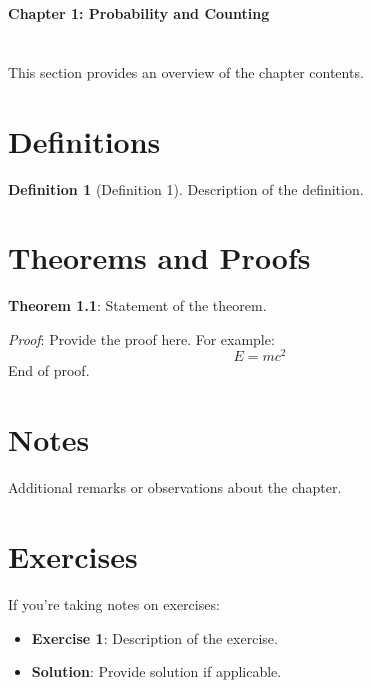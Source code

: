 \documentclass[12pt]{article}   %
\theoremstyle{definition}
\newtheorem{definition}{Definition}[section]
\theoremstyle{remark}
\begin{document}
\begin{center}
    \Large{\textbf{Chapter 1: Probability and Counting}} \\
\end{center}

\section{}
This section provides an overview of the chapter contents.

\section{Definitions}
\begin{definition}[Definition 1]
	Description of the definition.
\end{definition}

\section{Theorems and Proofs}
\textbf{Theorem 1.1}: Statement of the theorem.

\textit{Proof}: Provide the proof here. For example:
\[
E = mc^2
\]
End of proof.

\section{Notes}
Additional remarks or observations about the chapter.

\section{Exercises}
If you're taking notes on exercises:
\begin{itemize}
    \item \textbf{Exercise 1}: Description of the exercise.
    \item \textbf{Solution}: Provide solution if applicable.
\end{itemize}

\end{document}
